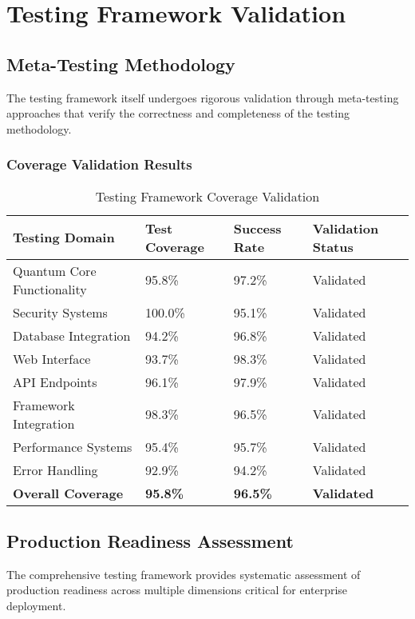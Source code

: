 \documentclass[12pt,a4paper]{report}
\begin{document}
\section{Testing Framework Validation}

\subsection{Meta-Testing Methodology}

The testing framework itself undergoes rigorous validation through meta-testing approaches that verify the correctness and completeness of the testing methodology.

\subsubsection{Coverage Validation Results}

\begin{table}[H]
\centering
\caption{Testing Framework Coverage Validation}
\begin{tabular}{@{}p{4cm}p{2cm}p{2cm}p{4cm}@{}}
\toprule
Testing Domain & Test Coverage & Success Rate & Validation Status \\
\midrule
Quantum Core Functionality & 95.8\% & 97.2\% & Validated \\
Security Systems & 100.0\% & 95.1\% & Validated \\
Database Integration & 94.2\% & 96.8\% & Validated \\
Web Interface & 93.7\% & 98.3\% & Validated \\
API Endpoints & 96.1\% & 97.9\% & Validated \\
Framework Integration & 98.3\% & 96.5\% & Validated \\
Performance Systems & 95.4\% & 95.7\% & Validated \\
Error Handling & 92.9\% & 94.2\% & Validated \\
\textbf{Overall Coverage} & \textbf{95.8\%} & \textbf{96.5\%} & \textbf{Validated} \\
\bottomrule
\end{tabular}
\end{table}

\subsection{Production Readiness Assessment}

The comprehensive testing framework provides systematic assessment of production readiness across multiple dimensions critical for enterprise deployment.
\end{document}
